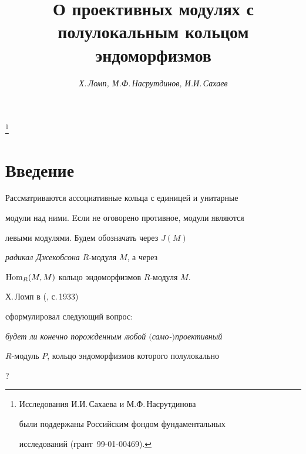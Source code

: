 \author{\it Х.\,Ломп, М.Ф.\,Насрутдинов, И.И.\,Сахаев}




\title{О проективных модулях с полулокальным кольцом эндоморфизмов}


\thanks{Исследования И.И.\,Сахаева и М.Ф.\,Насрутдинова


были поддержаны Российским фондом фундаментальных


исследований (грант \No\,99-01-00469).}





\date{}




\pagestyle{plain} %







\maketitle


\label{begin}











\section{Введение} 





Рассматриваются ассоциативные кольца с единицей и унитарные 


модули над ними. Eсли не оговорено противное, модули являются 


левыми модулями. Будем обозначать через $J(M)$ 


{\em радикал Джекобсона} $R$-модуля $M$, а через 


$\operatorname{Hom}_R(M,M)$ кольцо эндоморфизмов $R$-модуля $M$. 


Х.\,Ломп в (\cite{lomp99}, с.\,1933)


сформулировал следующий вопрос: 


{\em будет ли конечно порожденным любой $($само-$)$проективный 


$R$-модуль $P$, кольцо эндоморфизмов которого полулокально}? 


